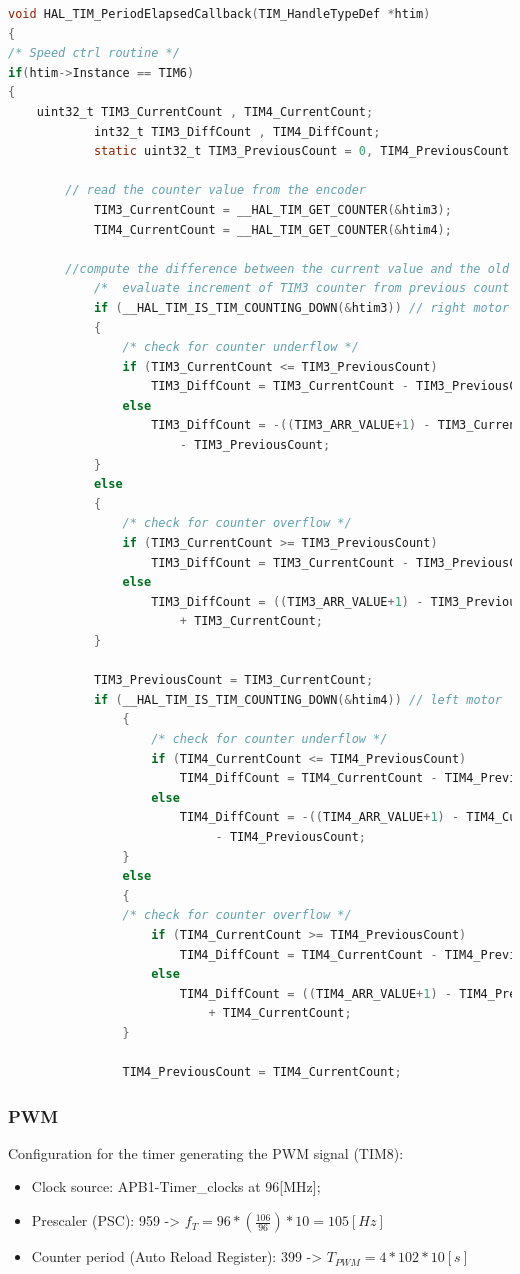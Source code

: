 \documentclass[english]{article}
\begin{document}
\begin{lstlisting}[language=C, caption={encoder code in order to have the current speed of each motor }, label={lst:encoder} ]
void HAL_TIM_PeriodElapsedCallback(TIM_HandleTypeDef *htim)
{
/* Speed ctrl routine */
if(htim->Instance == TIM6)
{
    uint32_t TIM3_CurrentCount , TIM4_CurrentCount;
            int32_t TIM3_DiffCount , TIM4_DiffCount;
            static uint32_t TIM3_PreviousCount = 0, TIM4_PreviousCount = 0;

        // read the counter value from the encoder
            TIM3_CurrentCount = __HAL_TIM_GET_COUNTER(&htim3);
            TIM4_CurrentCount = __HAL_TIM_GET_COUNTER(&htim4);

        //compute the difference between the current value and the old value
            /*  evaluate increment of TIM3 counter from previous count  */
            if (__HAL_TIM_IS_TIM_COUNTING_DOWN(&htim3)) // right motor
            {
                /* check for counter underflow */
                if (TIM3_CurrentCount <= TIM3_PreviousCount)
                    TIM3_DiffCount = TIM3_CurrentCount - TIM3_PreviousCount;
                else
                    TIM3_DiffCount = -((TIM3_ARR_VALUE+1) - TIM3_CurrentCount) 
                        - TIM3_PreviousCount;
            }
            else
            {
                /* check for counter overflow */
                if (TIM3_CurrentCount >= TIM3_PreviousCount)
                    TIM3_DiffCount = TIM3_CurrentCount - TIM3_PreviousCount;
                else
                    TIM3_DiffCount = ((TIM3_ARR_VALUE+1) - TIM3_PreviousCount) 
                        + TIM3_CurrentCount;
            }

            TIM3_PreviousCount = TIM3_CurrentCount;
            if (__HAL_TIM_IS_TIM_COUNTING_DOWN(&htim4)) // left motor
				{
					/* check for counter underflow */
					if (TIM4_CurrentCount <= TIM4_PreviousCount)
						TIM4_DiffCount = TIM4_CurrentCount - TIM4_PreviousCount;
					else
						TIM4_DiffCount = -((TIM4_ARR_VALUE+1) - TIM4_CurrentCount)
                             - TIM4_PreviousCount;
				}
				else
				{
				/* check for counter overflow */
					if (TIM4_CurrentCount >= TIM4_PreviousCount)
						TIM4_DiffCount = TIM4_CurrentCount - TIM4_PreviousCount;
					else
						TIM4_DiffCount = ((TIM4_ARR_VALUE+1) - TIM4_PreviousCount) 
                            + TIM4_CurrentCount;
				}

				TIM4_PreviousCount = TIM4_CurrentCount;
\end{lstlisting}
\subsubsection{PWM}
Configuration for the timer generating the PWM signal (TIM8): 
\begin{itemize}
    \item Clock source: APB1-Timer\_clocks at 96[MHz]; 
    \item Prescaler (PSC): 959 -> $f_T = 96 * (\frac{106}{96}) * 10 = 105 [Hz]$
    \item Counter period (Auto Reload Register): 399 -> $T_{PWM} = 4 * 102 * 10[s]$
\end{itemize}
\end{document}
